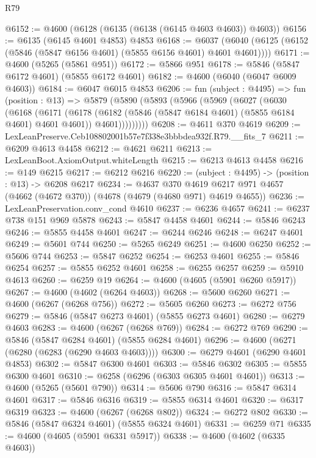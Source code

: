 \begin{lexlean}{R79}
\begin{coremodule}
@6152 := @4600 (@6128 (@6135 (@6138 (@6145 @4603 @4603)) @4603))
@6156 := @6135 (@6145 @4601 @4853) @4853
@6168 := @6037 (@6040 (@6125 (@6152 (@5846 (@5847 @6156 @4601) (@5855 @6156 @4601) @4601 @4601))))
@6171 := @4600 (@5265 (@5861 @951))
@6172 := @5866 @951
@6178 := @5846 (@5847 @6172 @4601) (@5855 @6172 @4601)
@6182 := @4600 (@6040 (@6047 @6009 @4603))
@6184 := @6047 @6015 @4853
@6206 := fun (subject : @4495) =>
  fun (position : @13) =>
  @5879
    (@5890
      (@5893
        (@5966
          (@5969
            (@6027
              (@6030
                (@6168
                  (@6171
                    (@6178
                      (@6182 (@5846 (@5847 @6184 @4601) (@5855 @6184 @4601) @4601 @4601))
                      @4601)))))))))
@6208 := @4611 @370 @4619
@6209 := LexLeanPreserve.Ceb108802001b57e7f338e3bbbdea932f.R79.__fits_7
@6211 := @6209 @4613 @4458
@6212 := @4621 @6211
@6213 := LexLeanBoot.AxiomOutput.whiteLength
@6215 := @6213 @4613 @4458
@6216 := @149 @6215
@6217 := @6212 @6216
@6220 := (subject : @4495) -> (position : @13) -> @6208 @6217
@6234 := @4637
    @370
    @4619
    @6217
    @971
    @4657
    (@4662 (@4672 @370))
    (@4678 (@4679 (@4680 @971) @4619 @4655))
@6236 := LexLeanPreservation.conv_cond @4610
@6237 := @6236 @4657
@6241 := @6237 @738 @151 @969 @5878
@6243 := @5847 @4458 @4601
@6244 := @5846 @6243
@6246 := @5855 @4458 @4601
@6247 := @6244 @6246
@6248 := @6247 @4601
@6249 := @5601 @744
@6250 := @5265 @6249
@6251 := @4600 @6250
@6252 := @5606 @744
@6253 := @5847 @6252
@6254 := @6253 @4601
@6255 := @5846 @6254
@6257 := @5855 @6252 @4601
@6258 := @6255 @6257
@6259 := @5910 @4613
@6260 := @6259 @19
@6264 := @4600 (@4605 (@5901 @6260 @5917))
@6267 := @4600 (@4602 (@6264 @4603))
@6268 := @5600 @6260
@6271 := @4600 (@6267 (@6268 @756))
@6272 := @5605 @6260
@6273 := @6272 @756
@6279 := @5846 (@5847 @6273 @4601) (@5855 @6273 @4601)
@6280 := @6279 @4603
@6283 := @4600 (@6267 (@6268 @769))
@6284 := @6272 @769
@6290 := @5846 (@5847 @6284 @4601) (@5855 @6284 @4601)
@6296 := @4600 (@6271 (@6280 (@6283 (@6290 @4603 @4603))))
@6300 := @6279 @4601 (@6290 @4601 @4853)
@6302 := @5847 @6300 @4601
@6303 := @5846 @6302
@6305 := @5855 @6300 @4601
@6310 := @6258 (@6296 (@6303 @6305 @4601 @4601))
@6313 := @4600 (@5265 (@5601 @790))
@6314 := @5606 @790
@6316 := @5847 @6314 @4601
@6317 := @5846 @6316
@6319 := @5855 @6314 @4601
@6320 := @6317 @6319
@6323 := @4600 (@6267 (@6268 @802))
@6324 := @6272 @802
@6330 := @5846 (@5847 @6324 @4601) (@5855 @6324 @4601)
@6331 := @6259 @71
@6335 := @4600 (@4605 (@5901 @6331 @5917))
@6338 := @4600 (@4602 (@6335 @4603))

\end{coremodule}
\end{lexlean}

